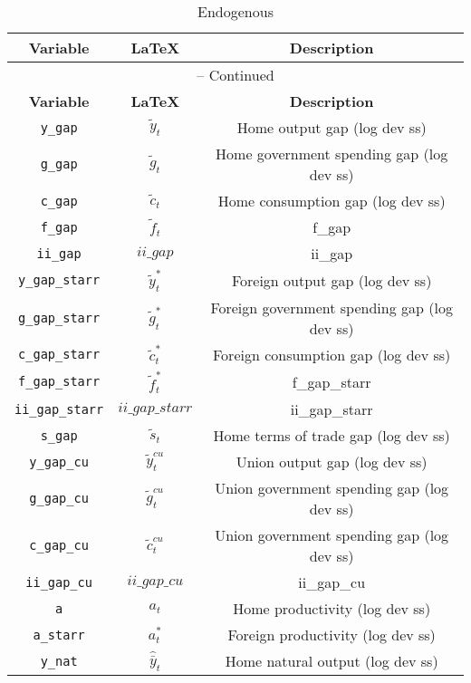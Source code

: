 \begin{center}
\begin{longtable}{ccc}
\caption{Endogenous}\\%
\hline%
\multicolumn{1}{c}{\textbf{Variable}} &
\multicolumn{1}{c}{\textbf{\LaTeX}} &
\multicolumn{1}{c}{\textbf{Description}}\\%
\hline\hline%
\endfirsthead
\multicolumn{3}{c}{{\tablename} \thetable{} -- Continued}\\%
\hline%
\multicolumn{1}{c}{\textbf{Variable}} &
\multicolumn{1}{c}{\textbf{\LaTeX}} &
\multicolumn{1}{c}{\textbf{Description}}\\%
\hline\hline%
\endhead
\texttt{y\_gap} & ${\tilde y_t}$ & Home output gap (log dev ss)\\
\texttt{g\_gap} & ${\tilde g_t}$ & Home government spending gap (log dev ss)\\
\texttt{c\_gap} & ${\tilde c_t}$ & Home consumption gap (log dev ss)\\
\texttt{f\_gap} & ${\tilde f_t}$ & f\_gap\\
\texttt{ii\_gap} & $ii\_gap$ & ii\_gap\\
\texttt{y\_gap\_starr} & ${\tilde y_t^*}$ & Foreign output gap (log dev ss)\\
\texttt{g\_gap\_starr} & ${\tilde g_t^*}$ & Foreign government spending gap (log dev ss)\\
\texttt{c\_gap\_starr} & ${\tilde c_t^*}$ & Foreign consumption gap (log dev ss)\\
\texttt{f\_gap\_starr} & ${\tilde f_t^*}$ & f\_gap\_starr\\
\texttt{ii\_gap\_starr} & $ii\_gap\_starr$ & ii\_gap\_starr\\
\texttt{s\_gap} & ${\tilde s_t}$ & Home terms of trade gap (log dev ss)\\
\texttt{y\_gap\_cu} & ${\tilde y_t^{cu}}$ & Union output gap (log dev ss)\\
\texttt{g\_gap\_cu} & ${\tilde g_t^{cu}}$ & Union government spending gap (log dev ss)\\
\texttt{c\_gap\_cu} & ${\tilde c_t^{cu}}$ & Union government spending gap (log dev ss)\\
\texttt{ii\_gap\_cu} & $ii\_gap\_cu$ & ii\_gap\_cu\\
\texttt{a} & ${a_t}$ & Home productivity (log dev ss)\\
\texttt{a\_starr} & ${a_t^*}$ & Foreign productivity (log dev ss)\\
\texttt{y\_nat} & ${\hat {\bar y}_t}$ & Home natural output (log dev ss)\\

\end{longtable}
\end{center}
